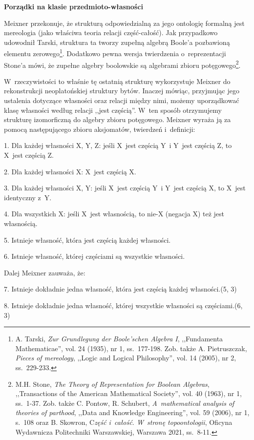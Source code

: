 \textbf{Porządki na klasie przedmioto-własności}

Meixner przekonuje, że strukturą odpowiedzialną za jego ontologię formalną jest mereologia (jako właściwa teoria relacji część-całość). Jak przypadkowo udowodnił Tarski, struktura ta tworzy zupełną algebrą Boole'a pozbawioną elementu zerowego\footnote{ A. Tarski, \textit{Zur Grundlegung der Boole'schen Algebra I}, ,,Fundamenta Mathematicae'', vol. 24 (1935), nr 1, ss.~177-198. Zob. także A. Pietruszczak, \textit{Pieces of mereology}, ,,Logic and Logical Philosophy'', vol. 14 (2005), nr 2, ss.~229-233.}. Dodatkowo pewna wersja twierdzenia o~reprezentacji Stone'a mówi, że zupełne algebry boolowskie są algebrami zbioru potęgowego\footnote{ M.H. Stone, \textit{The Theory of Representation for Boolean Algebras}, ,,Transactions of the American Mathematical Society'', vol. 40 (1963), nr 1, ss.~1-37. Zob. także C. Pontow, R. Schubert, \textit{A~mathematical analysis of theories of parthood}, ,,Data and Knowledge Engineering'', vol. 59 (2006), nr 1, s.~108 oraz B. Skowron, C\textit{zęść i~całość. W~stronę topoontologii}, Oficyna Wydawnicza Politechniki Warszawskiej, Warszawa 2021, ss.~8-11.}.

W~rzeczywistości to właśnie tę ostatnią strukturę wykorzystuje Meixner do rekonstrukcji neoplatońskiej struktury bytów. Inaczej mówiąc, przyjmując jego ustalenia dotyczące własności oraz relacji między nimi, możemy uporządkować klasę własności według relacji ,,jest częścią''. W~ten sposób otrzymujemy strukturę izomorficzną do algebry zbioru potęgowego. Meixner wyraża ją za pomocą następującego zbioru aksjomatów, twierdzeń i~definicji:

1. Dla każdej własności X, Y, Z: jeśli X~jest częścią Y~i Y~jest częścią Z, to X~jest częścią Z.

2. Dla każdej własności X: X~jest częścią X.

3. Dla każdej własności X, Y: jeśli X~jest częścią Y~i Y~jest częścią X, to X~jest identyczny z~Y.

4. Dla wszystkich X: jeśli X~jest własnością, to nie-X (negacja X) też jest własnością.

5. Istnieje własność, która jest częścią każdej własności.

6. Istnieje własność, której częściami są wszystkie własności.

Dalej Meixner zauważa, że:

7. Istnieje dokładnie jedna własność, która jest częścią każdej własności.(5, 3)

8. Istnieje dokładnie jedna własność, której wszystkie własności są częściami.(6, 3)

